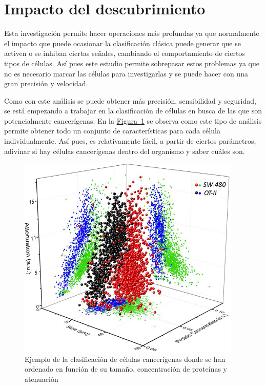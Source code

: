 \documentclass[a4paper, 12pt, UTF8]{article}
\begin{document}
\section{Impacto del descubrimiento}

Esta investigación permite hacer operaciones más profundas ya que normalmente el impacto que puede ocasionar la clasificación clásica puede generar que se activen o se inhiban ciertas señales, cambiando el comportamiento de ciertos tipos de células. Así pues este estudio permite sobrepasar estos problemas ya que no es necesario marcar las células para investigarlas y se puede hacer con una gran precisión y velocidad.

Como con este análisis se puede obtener más precisión, sensibilidad y seguridad, se está empezando a trabajar en la clasificación de células en busca de las que son potencialmente cancerígenas. En la \hyperref[fig:impacto_1]{Figura~\ref{fig:impacto_1}} se observa como este tipo de análisis permite obtener todo un conjunto de características para cada célula individualmente. 
Así pues, es relativamente fácil, a partir de ciertos parámetros, adivinar si hay células cancerígenas dentro del organismo y saber cuáles son.

\begin{figure}[H]
	\centering
	\includegraphics[width=0.95\textwidth]{impacto_1}
	\caption{Ejemplo de la clasificación de células cancerígenas donde se han ordenado en función de su tamaño, concentración de proteínas y atenuación}
	\label{fig:impacto_1}
\end{figure}
\end{document}
